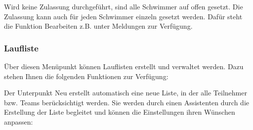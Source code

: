 \documentclass[11pt,a4paper,twoside,ngerman]{article}
\begin{document}
Wird keine Zulassung durchgeführt, sind alle Schwimmer auf \glqq{}offen\grqq{} gesetzt. Die Zulassung kann auch für jeden Schwimmer einzeln gesetzt werden. Dafür steht die Funktion \glqq{}Bearbeiten\grqq{} z.B. unter Meldungen zur Verfügung.


\subsubsection*{Laufliste}
\label{lbl:jauswertungmenus:laufliste}Über diesen Menüpunkt können Lauflisten erstellt und verwaltet werden. Dazu stehen Ihnen die folgenden Funktionen zur Verfügung:

Der Unterpunkt \glqq{}Neu\grqq{} erstellt automatisch eine neue Liste, in der alle Teilnehmer bzw. Teams berücksichtigt werden. Sie werden durch einen Assistenten durch die Erstellung der Liste begleitet und können die Einstellungen ihren Wünschen anpassen:
\end{document}
